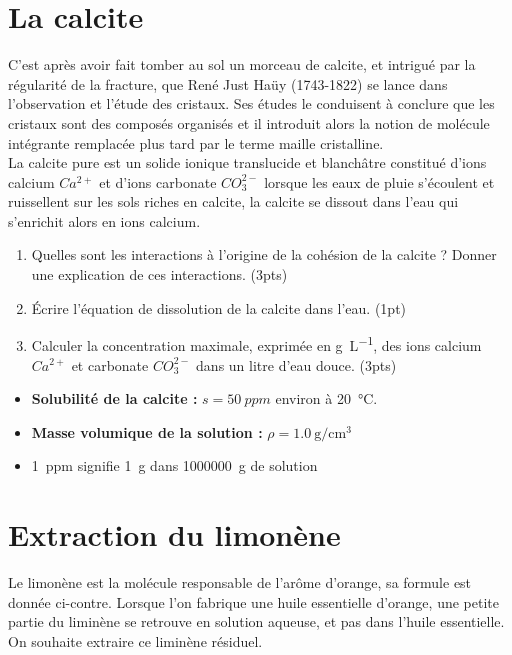 \documentclass[a4paper,fontsize=12pt,fleqn]{scrartcl}%
\begin{document}
\maketitle

\section{La calcite}
C'est après avoir fait tomber au sol un morceau de calcite, et intrigué par la régularité de la fracture, que René Just Haüy (1743-1822) se lance dans l'observation et l'étude des cristaux. Ses études le conduisent à conclure que les cristaux sont des composés organisés et il introduit alors la notion de molécule intégrante remplacée plus tard par le terme maille cristalline.\\
La calcite pure est un solide ionique translucide et blanchâtre constitué d'ions calcium $Ca^{2+}$ et d'ions carbonate $CO_3^{2-}$ lorsque les eaux de pluie s'écoulent et ruissellent sur les sols riches en calcite, la calcite se dissout dans l'eau qui s'enrichit alors en ions calcium.

\begin{enumerate}
    \item Quelles sont les interactions à l'origine de la cohésion de la calcite ? Donner une explication de ces interactions. (3pts)
    \item Écrire l'équation de dissolution de la calcite dans l'eau. (1pt)
    \item Calculer la concentration maximale, exprimée en \unit{\gram\per\liter}, des ions calcium $Ca^{2+}$ et carbonate $CO_3^{2-}$ dans un litre d'eau douce. (3pts)
\end{enumerate}
\begin{data}
    \begin{itemize}
        \item \textbf{Solubilité de la calcite :} $s = \SI{50}{ppm}$ environ à \SI{20}{\celsius}.
        \item \textbf{Masse volumique de la solution :} $\rho = \SI{1,0}{\gram\per\centi\meter\cubed}$
        \item \SI{1}{ppm} signifie \SI{1}{g} dans \SI{1000000}{g} de solution
    \end{itemize}
\end{data}

\newpage 
\section{Extraction du limonène}
\begin{minipage}{.49\linewidth}
    Le limonène est la molécule responsable de l'arôme d'orange, sa formule est donnée ci-contre. Lorsque l'on fabrique une huile essentielle d'orange, une petite partie du liminène se retrouve en solution aqueuse, et pas dans l'huile essentielle. On souhaite extraire ce liminène résiduel.
\end{minipage}
\begin{minipage}{.49\linewidth}
    \centering 
\end{minipage}
\end{document}
